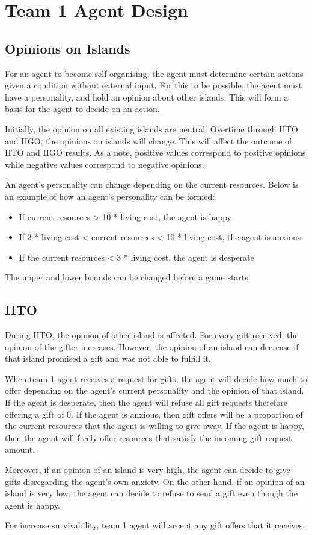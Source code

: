 \chapter{Team 1 Agent Design}

\section{Opinions on Islands}
For an agent to become self-organising, the agent must determine certain actions given a condition without external input. For this to be possible, the agent must have a personality, and hold an opinion about other islands. This will form a basis for the agent to decide on an action.

Initially, the opinion on all existing islands are neutral. Overtime through IITO and IIGO, the opinions on islands will change. This will affect the outcome of IITO and IIGO results. As a note, positive values correspond to positive opinions while negative values correspond to negative opinions.

An agent's personality can change depending on the current resources. Below is an example of how an agent's personality can be formed:
\begin{itemize}
    \item If current resources > 10 * living cost, the agent is happy
    \item If 3 * living cost < current resources < 10 * living cost, the agent is anxious
    \item If the current resources < 3 * living cost, the agent is desperate 
\end{itemize}
The upper and lower bounds can be changed before a game starts. 

\section{IITO}
During IITO, the opinion of other island is affected. For every gift received, the opinion of the gifter increases. However, the opinion of an island can decrease if that island promised a gift and was not able to fulfill it. 

When team 1 agent receives a request for gifts, the agent will decide how much to offer depending on the agent's current personality and the opinion of that island. If the agent is desperate, then the agent will refuse all gift requests therefore offering a gift of 0. If the agent is anxious, then gift offers will be a proportion of the current resources that the agent is willing to give away. If the agent is happy, then the agent will freely offer resources that satisfy the incoming gift request amount.

Moreover, if an opinion of an island is very high, the agent can decide to give gifts disregarding the agent's own anxiety. On the other hand, if an opinion of an island is very low, the agent can decide to refuse to send a gift even though the agent is happy. 

For increase survivability, team 1 agent will accept any gift offers that it receives. 
